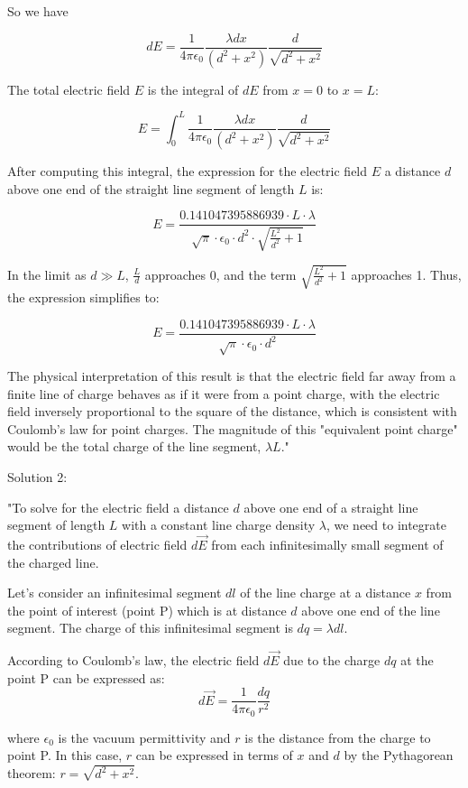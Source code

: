 So we have

\[ dE = \frac{1}{4\pi\epsilon_0} \frac{\lambda dx}{(d^2 + x^2)} \frac{d}{\sqrt{d^2 + x^2}} \]

The total electric field \( E \) is the integral of \( dE \) from \( x = 0 \) to \( x = L \):

\[ E = \int_0^L \frac{1}{4\pi\epsilon_0} \frac{\lambda dx}{(d^2 + x^2)} \frac{d}{\sqrt{d^2 + x^2}} \]

After computing this integral, the expression for the electric field \( E \) a distance \( d \) above one end of the straight line segment of length \( L \) is:

\[ E = \frac{0.141047395886939 \cdot L \cdot \lambda}{\sqrt{\pi} \cdot \epsilon_0 \cdot d^2 \cdot \sqrt{\frac{L^2}{d^2} + 1}} \]

In the limit as \( d \gg L \), \( \frac{L}{d} \) approaches 0, and the term \( \sqrt{\frac{L^2}{d^2} + 1} \) approaches 1. Thus, the expression simplifies to:

\[ E = \frac{0.141047395886939 \cdot L \cdot \lambda}{\sqrt{\pi} \cdot \epsilon_0 \cdot d^2} \]

The physical interpretation of this result is that the electric field far away from a finite line of charge behaves as if it were from a point charge, with the electric field inversely proportional to the square of the distance, which is consistent with Coulomb's law for point charges. The magnitude of this "equivalent point charge" would be the total charge of the line segment, \( \lambda L \)."

Solution 2:

"To solve for the electric field a distance \( d \) above one end of a straight line segment of length \( L \) with a constant line charge density \( \lambda \), we need to integrate the contributions of electric field \( d\vec{E} \) from each infinitesimally small segment of the charged line.

Let's consider an infinitesimal segment \( dl \) of the line charge at a distance \( x \) from the point of interest (point P) which is at distance \( d \) above one end of the line segment. The charge of this infinitesimal segment is \( dq = \lambda dl \).

According to Coulomb's law, the electric field \( d\vec{E} \) due to the charge \( dq \) at the point P can be expressed as:
\[ d\vec{E} = \frac{1}{4\pi\epsilon_0} \frac{dq}{r^2} \]

where \( \epsilon_0 \) is the vacuum permittivity and \( r \) is the distance from the charge to point P. In this case, \( r \) can be expressed in terms of \( x \) and \( d \) by the Pythagorean theorem: \( r = \sqrt{d^2 + x^2} \).

